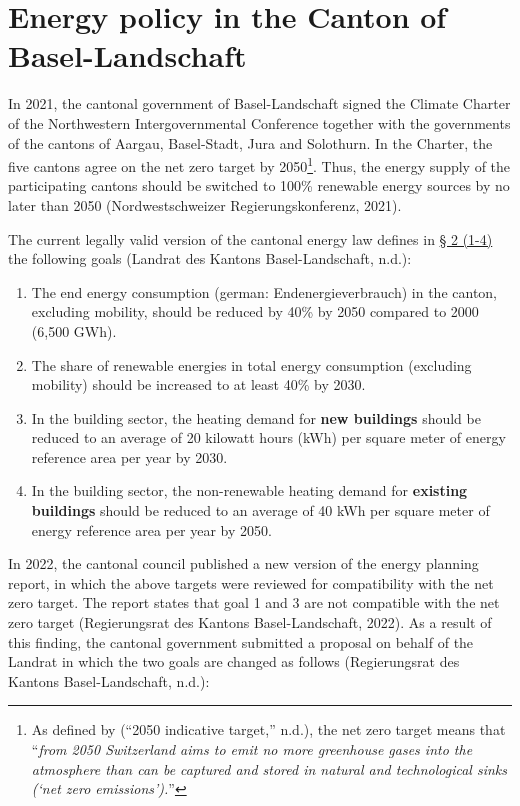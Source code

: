 \documentclass[
  letterpaper,
  DIV=11,
  numbers=noendperiod]{scrreprt}
\providecommand{\tightlist}{%
  \setlength{\itemsep}{0pt}\setlength{\parskip}{0pt}}\usepackage{longtable,booktabs,array}
\begin{document}
\hypertarget{cantonal-energy-planning}{%
\section{Energy policy in the Canton of
Basel-Landschaft}\label{cantonal-energy-planning}}

In 2021, the cantonal government of Basel-Landschaft signed the Climate
Charter of the Northwestern Intergovernmental Conference together with
the governments of the cantons of Aargau, Basel-Stadt, Jura and
Solothurn. In the Charter, the five cantons agree on the net zero target
by 2050\footnote{As defined by ({``2050 indicative target,''} n.d.), the
  net zero target means that ``\emph{from 2050 Switzerland aims to emit
  no more greenhouse gases into the atmosphere than can be captured and
  stored in natural and technological sinks (`net zero emissions').}''}.
Thus, the energy supply of the participating cantons should be switched
to 100\% renewable energy sources by no later than 2050
(Nordwestschweizer Regierungskonferenz, 2021).

The current legally valid version of the cantonal energy law defines in
\href{https://bl.clex.ch/app/de/texts_of_law/490/art/2}{§ 2 (1-4)} the
following goals (Landrat des Kantons Basel-Landschaft, n.d.):

\begin{enumerate}
\def\labelenumi{\arabic{enumi}.}
\tightlist
\item
  The end energy consumption (german: Endenergieverbrauch) in the
  canton, excluding mobility, should be reduced by 40\% by 2050 compared
  to 2000 (6,500 GWh).
\item
  The share of renewable energies in total energy consumption (excluding
  mobility) should be increased to at least 40\% by 2030.
\item
  In the building sector, the heating demand for \textbf{new buildings}
  should be reduced to an average of 20 kilowatt hours (kWh) per square
  meter of energy reference area per year by 2030.
\item
  In the building sector, the non-renewable heating demand for
  \textbf{existing buildings} should be reduced to an average of 40 kWh
  per square meter of energy reference area per year by 2050.
\end{enumerate}

In 2022, the cantonal council published a new version of the energy
planning report, in which the above targets were reviewed for
compatibility with the net zero target. The report states that goal 1
and 3 are not compatible with the net zero target (Regierungsrat des
Kantons Basel-Landschaft, 2022). As a result of this finding, the
cantonal government submitted a proposal on behalf of the Landrat in
which the two goals are changed as follows (Regierungsrat des Kantons
Basel-Landschaft, n.d.):
\end{document}
